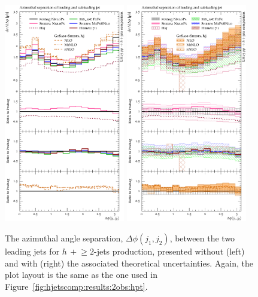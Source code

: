 \begin{figure}[t!]
  \centering
  \includegraphics[width=0.47\textwidth]{figures/hjetscomp_u_deltaphi_jj_incl.pdf}
  \hfill
  \includegraphics[width=0.47\textwidth]{figures/hjetscomp_deltaphi_jj_incl.pdf}
  \caption{\label{fig:hjetscomp:results:2obs:dphijj}%
    The azimuthal angle separation, $\Delta\phi(j_1,j_2)$, between the
    two leading jets for $h\,+\!\ge\!2$-jets production, presented
    without (left) and with (right) the associated theoretical
    uncertainties. Again, the plot layout is the same as the one used in
    Figure~\ref{fig:hjetscomp:results:2obs:hpt}.}
\end{figure}

